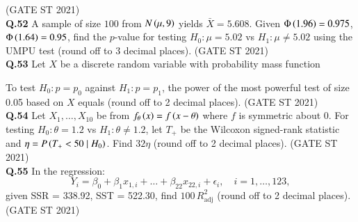 \documentclass[journal,12pt,onecolumn]{IEEEtran}
\theoremstyle{remark}
\begin{document}
\hfill (GATE ST 2021) \\
\textbf{Q.52}
A sample of size $100$ from $N\left(\mu,9\right)$ yields $\bar{X} = 5.608$.  
Given $\Phi\left(1.96\right)= 0.975$, $\Phi\left(1.64\right) = 0.95$,  
find the $p$-value for testing $H_0: \mu = 5.02$ vs $H_1: \mu \neq 5.02$ using the UMPU test  
(round off to 3 decimal places).
\hfill (GATE ST 2021) \\
\textbf{Q.53}
Let $X$ be a discrete random variable with probability mass function

  \bigskip

To test $H_0: p = p_0$ against $H_1: p = p_1$, the power of the most powerful test of size 0.05 based on $X$ equals (round off to 2 decimal places).
\hfill (GATE ST 2021) \\
\textbf{Q.54}
Let $X_1,\dots,X_{10}$ be from $f_\theta\left(x\right) = f\left(x-\theta\right)$ where $f$ is symmetric about $0$.  
For testing $H_0: \theta = 1.2$ vs $H_1: \theta \neq 1.2$,  
let $T_+$ be the Wilcoxon signed-rank statistic and $\eta = P\left(T_+ < 50 \mid H_0\right)$.  
Find $32 \eta$ (round off to 2 decimal places).
\hfill (GATE ST 2021) \\
\textbf{Q.55}
In the regression:
\[
Y_i = \beta_0 + \beta_1 x_{1,i} + \dots + \beta_{22} x_{22,i} + \epsilon_i, \quad i=1,\dots,123,
\]
given SSR = 338.92, SST = 522.30,  
find $100\, R_{\text{adj}}^2$ (round off to 2 decimal places).
\hfill (GATE ST 2021) \\
\end{document}
